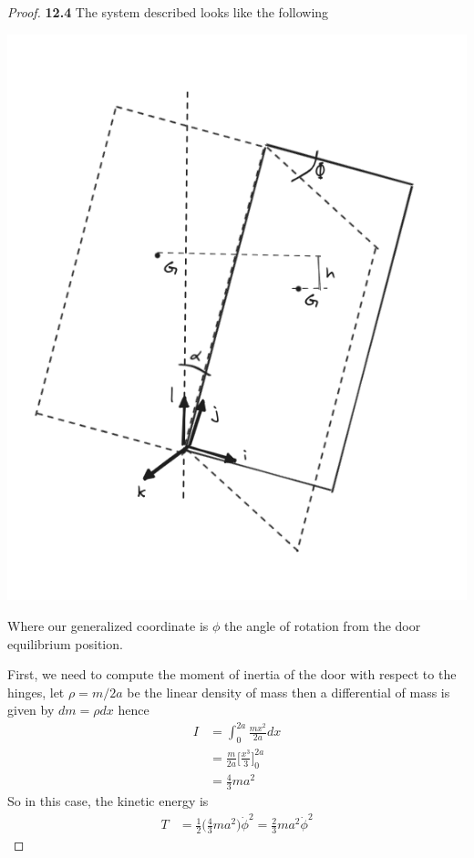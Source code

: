 \documentclass[11pt]{article}
\theoremstyle{definition}
\begin{document}
\begin{proof}{\textbf{12.4}}
    The system described looks like the following
    \begin{center}
        \includegraphics[scale=0.45]{ch12-4.png}
    \end{center}
    Where our generalized coordinate is $\phi$ the angle of rotation from the
    door equilibrium position.
    
    First, we need to compute the moment of inertia of
    the door with respect to the hinges, let $\rho = m/2a$  be
    the linear density of mass then a differential of mass is given by
    $dm = \rho dx$ hence 
    \begin{align*}
        I &= \int_0^{2a} \frac{mx^2}{2a} dx\\
        &= \frac{m}{2a} \bigg[\frac{x^3}{3}\bigg]_0^{2a}\\
        &= \frac{4}{3}ma^2
    \end{align*}
    So in this case, the kinetic energy is
    \begin{align*}
        T &= \frac{1}{2}\bigg(\frac{4}{3}ma^2\bigg) \dot\phi^2
        = \frac{2}{3}ma^2 \dot\phi^2 
    \end{align*}


\end{proof}
\end{document}

